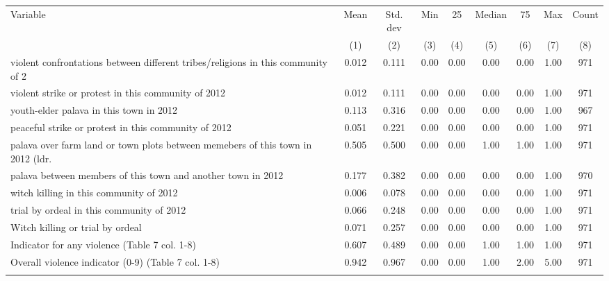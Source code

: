 \begin{tabular}{lcccccccc}
\hline \noalign{\smallskip}Variable & Mean & Std. dev & Min & 25 & Median & 75 & Max & Count\\
 & (1) & (2) & (3) & (4) & (5) & (6) & (7) & (8)\\
\noalign{\smallskip}\hline \noalign{\smallskip}violent confrontations between different tribes/religions in this community of 2 & 0.012 & 0.111 & 0.00 & 0.00 & 0.00 & 0.00 & 1.00 & 971\\
violent strike or protest in this community of 2012 & 0.012 & 0.111 & 0.00 & 0.00 & 0.00 & 0.00 & 1.00 & 971\\
youth-elder palava in this town in 2012 & 0.113 & 0.316 & 0.00 & 0.00 & 0.00 & 0.00 & 1.00 & 967\\
peaceful strike or protest in this community of 2012 & 0.051 & 0.221 & 0.00 & 0.00 & 0.00 & 0.00 & 1.00 & 971\\
palava over farm land or town plots between memebers of this town in 2012 (ldr.  & 0.505 & 0.500 & 0.00 & 0.00 & 1.00 & 1.00 & 1.00 & 971\\
palava between members of this town and another town in 2012 & 0.177 & 0.382 & 0.00 & 0.00 & 0.00 & 0.00 & 1.00 & 970\\
witch killing in this community of 2012 & 0.006 & 0.078 & 0.00 & 0.00 & 0.00 & 0.00 & 1.00 & 971\\
trial by ordeal in this community of 2012 & 0.066 & 0.248 & 0.00 & 0.00 & 0.00 & 0.00 & 1.00 & 971\\
Witch killing or trial by ordeal & 0.071 & 0.257 & 0.00 & 0.00 & 0.00 & 0.00 & 1.00 & 971\\
Indicator for any violence (Table 7 col. 1-8) & 0.607 & 0.489 & 0.00 & 0.00 & 1.00 & 1.00 & 1.00 & 971\\
Overall violence indicator (0-9) (Table 7 col. 1-8) & 0.942 & 0.967 & 0.00 & 0.00 & 1.00 & 2.00 & 5.00 & 971\\
\noalign{\smallskip}\hline\end{tabular}
